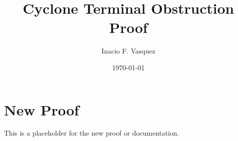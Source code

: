 \documentclass{article}
\title{Cyclone Terminal Obstruction Proof}
\author{Inacio F. Vasquez}
\date{\today}
\begin{document}
\maketitle

\section*{New Proof}
This is a placeholder for the new proof or documentation.
\end{document}
